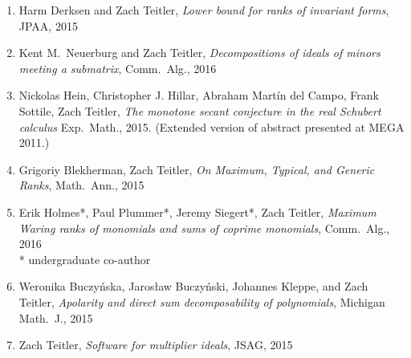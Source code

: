 \documentclass[12pt]{article}
\begin{document}
\begin{enumerate}
\item Harm Derksen and Zach Teitler,
\emph{Lower bound for ranks of invariant forms},
JPAA,
2015

\item Kent M.\ Neuerburg and Zach Teitler,
\emph{Decompositions of ideals of minors meeting a submatrix},
Comm.\ Alg.,
2016


\item Nickolas Hein, Christopher J. Hillar, Abraham Mart\'in del Campo, Frank Sottile, Zach Teitler,
\emph{The monotone secant conjecture in the real Schubert calculus}
Exp.\ Math.,
2015.
(Extended version of abstract presented at MEGA 2011.)

\item Grigoriy Blekherman, Zach Teitler,
\emph{On Maximum, Typical, and Generic Ranks},
Math.\ Ann.,
2015

\item Erik Holmes*, Paul Plummer*, Jeremy Siegert*, Zach Teitler,
\emph{Maximum Waring ranks of monomials and sums of coprime monomials},
Comm.\ Alg.,
2016\\
* undergraduate co-author

\item Weronika Buczy\'nska, Jaros{\l}aw Buczy\'nski, Johannes Kleppe, and Zach Teitler,
\emph{Apolarity and direct sum decomposability of polynomials},
Michigan Math.\ J.,
2015

\item Zach Teitler,
\emph{Software for multiplier ideals},
JSAG,
2015


\end{enumerate}
\end{document}
